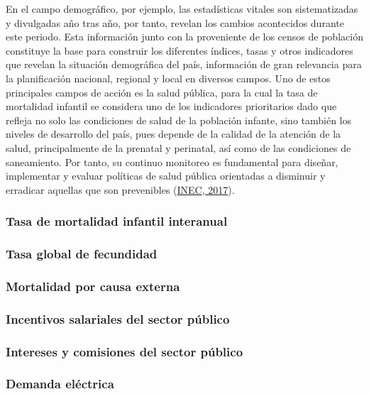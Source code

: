 \documentclass[
]{article}
\begin{document}
En el campo demográfico, por ejemplo, las estadísticas vitales son
sistematizadas y divulgadas año tras año, por tanto, revelan los cambios
acontecidos durante este periodo. Esta información junto con la
proveniente de los censos de población constituye la base para construir
los diferentes índices, tasas y otros indicadores que revelan la
situación demográfica del país, información de gran relevancia para la
planificación nacional, regional y local en diversos campos. Uno de
estos principales campos de acción es la salud pública, para la cual la
tasa de mortalidad infantil se considera uno de los indicadores
prioritarios dado que refleja no solo las condiciones de salud de la
población infante, sino también los niveles de desarrollo del país, pues
depende de la calidad de la atención de la salud, principalmente de la
prenatal y perinatal, así como de las condiciones de saneamiento. Por
tanto, su continuo monitoreo es fundamental para diseñar, implementar y
evaluar políticas de salud pública orientadas a disminuir y erradicar
aquellas que son prevenibles
(\protect\hyperlink{ref-calidad_vitales}{INEC, 2017}).

\subsubsection{Tasa de mortalidad infantil interanual}

\subsubsection{Tasa global de fecundidad}

\subsubsection{Mortalidad por causa externa}

\subsubsection{Incentivos salariales del sector público}

\subsubsection{Intereses y comisiones del sector público}

\subsubsection{Demanda eléctrica}
\end{document}
